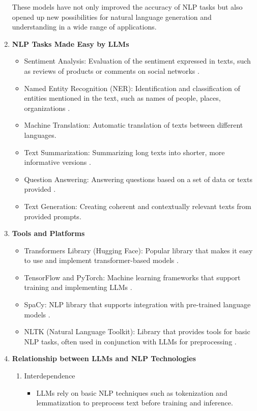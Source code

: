 \begin{enumerate}
\begin{itemize}
\end{itemize}
    These models have not only improved the accuracy of NLP tasks but also opened up new possibilities for natural language generation and understanding in a wide range of applications.
 \item \textbf{NLP Tasks Made Easy by LLMs}
 \begin{itemize}
 \item {Sentiment Analysis}: Evaluation of the sentiment expressed in texts, such as reviews of products or comments on social networks \cite{liu2022sentiment}.
 \item Named Entity Recognition (NER): Identification and classification of entities mentioned in the text, such as names of people, places, organizations \cite{belzner2023large}.
 \item Machine Translation: Automatic translation of texts between different languages.
 \item Text Summarization: Summarizing long texts into shorter, more informative versions \cite{han2021transformer}.
 \item Question Answering: Answering questions based on a set of data or texts provided \cite{Devlin2019}.
 \item Text Generation: Creating coherent and contextually relevant texts from provided prompts.
 \end{itemize}
 \item \textbf{Tools and Platforms}
 \begin{itemize}
 \item Transformers Library (Hugging Face): Popular library that makes it easy to use and implement transformer-based models \cite{hou2023}.
 \item TensorFlow and PyTorch: Machine learning frameworks that support training and implementing LLMs \cite{Beysolow2018}.
 \item SpaCy: NLP library that supports integration with pre-trained language models \cite{Beysolow2018}.
 \item NLTK (Natural Language Toolkit): Library that provides tools for basic NLP tasks, often used in conjunction with LLMs for preprocessing \cite{Beysolow2018}.
\end{itemize}
 \item \textbf{Relationship between LLMs and NLP Technologies}
\begin{enumerate}
 \item Interdependence
 \begin{itemize}
 \item LLMs rely on basic NLP techniques such as tokenization and lemmatization to preprocess text before training and inference.

\end{itemize}
\end{enumerate}
\end{enumerate}
